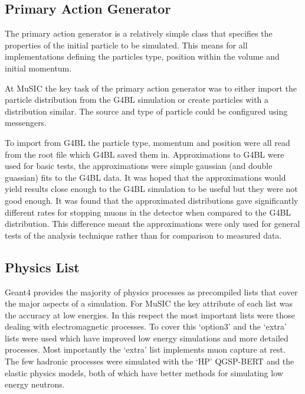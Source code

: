 \subsection{Primary Action Generator} %
\label{sec:primary_action_generator}
The primary action generator is a relatively simple class that specifies the properties of the initial particle to be simulated. This means for all implementations defining the particles type, position within the volume and initial momentum. 

At MuSIC the key task of the primary action generator was to either import the particle distribution from the G4BL simulation or create particles with a distribution similar. The source and type of particle could be configured using messengers.

To import from G4BL the particle type, momentum and position were all read from the root file which G4BL saved them in. Approximations to G4BL were used for basic tests, the approximations were simple gaussian (and double guassian) fits to the G4BL data. It was hoped that the approximations would yield results close enough to the G4BL simulation to be useful but they were not good enough. It was found that the approximated distributions gave significantly different rates for stopping muons in the detector when compared to the G4BL distribution. This difference meant the approximations were only used for general tests of the analysis technique rather than for comparison to measured data. 

\subsection{Physics List} %
\label{sec:physics_list}
Geant4 provides the majority of physics processes as precompiled lists that cover the major aspects of a simulation. For MuSIC the key attribute of each list was the accuracy at low energies. In this respect the most important lists were those dealing with electromagnetic processes. To cover this `option3' and the `extra' lists were used which have improved low energy simulations and more detailed processes. Most importantly the `extra' list implements muon capture at rest. The few hadronic processes were simulated with the `HP' QGSP-BERT and the elastic physics models, both of which have better methods for simulating low energy neutrons.

